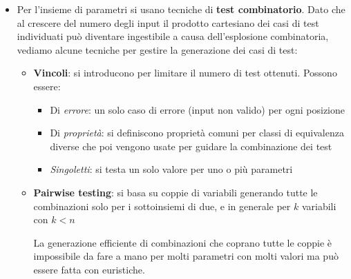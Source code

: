 \begin{enumerate}
\begin{itemize}
		\item Per l'insieme di parametri si usano tecniche di \textbf{test combinatorio}. Dato che al crescere del numero degli input il prodotto cartesiano dei casi di test individuati può diventare ingestibile a causa dell'esplosione combinatoria, vediamo alcune tecniche per gestire la generazione dei casi di test:
		\begin{itemize}
			\item \textbf{Vincoli}: si introducono per limitare il numero di test ottenuti. Possono essere:
			\begin{itemize}
				\item Di \textit{errore}: un solo caso di errore (input non valido) per ogni posizione
				\item Di \textit{proprietà}: si definiscono proprietà comuni per classi di equivalenza diverse che poi vengono usate per guidare la combinazione dei test
				\item \textit{Singoletti}: si testa un solo valore per uno o più parametri
			\end{itemize}
			\item \textbf{Pairwise testing}: si basa su coppie di variabili generando tutte le combinazioni solo per i sottoinsiemi di due, e in generale per $k$ variabili con $k<n$
			
			\begin{note}
				La generazione efficiente di combinazioni che coprano tutte le coppie è impossibile da fare a mano per molti parametri con molti valori ma può essere fatta con euristiche.
			\end{note}
		\end{itemize}
	\end{itemize}
\end{enumerate}